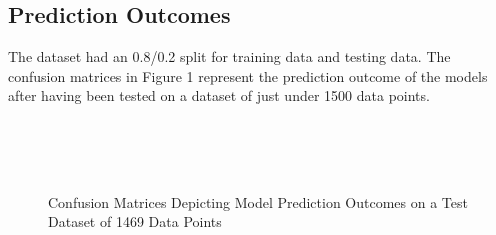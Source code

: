 \documentclass[conference]{IEEEtran}
\begin{document}
\subsection{Prediction Outcomes}
The dataset had an 0.8/0.2 split for training data and testing data. The confusion matrices in Figure 1 represent the prediction outcome of the models after having been tested on a dataset of just under 1500 data points.
\begin{center}
\begin{figure}
\centering
{}%
\qquad
{}%
\qquad \\
%
\qquad
{}%
\qquad \\
%
\qquad
{}%
\qquad \\
\caption{Confusion Matrices Depicting Model Prediction Outcomes on a Test Dataset of 1469 Data Points}%
\label{fig:example}
\end{figure}
\end{center}
\end{document}

